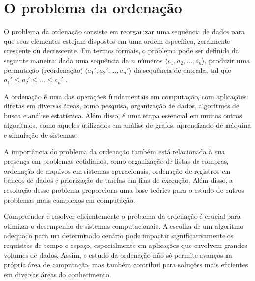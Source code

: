 \section{O problema da ordenação}
O problema da ordenação consiste em reorganizar uma sequência de dados para que seus elementos estejam dispostos em uma ordem específica, geralmente crescente ou decrescente. Em termos formais, o problema pode ser definido da seguinte maneira: dada uma sequência de  $n$  números  $\langle a_1, a_2, ..., a_n \rangle$, produzir uma permutação (reordenação) $\langle a_1', a_2', ..., a_n' \rangle$ da sequência de entrada, tal que $a_1' \le a_2' \le ... \le a_n'$  \cite[p. 46]{cormen2012algoritmos}.

A ordenação é uma das operações fundamentais em computação, com aplicações diretas em diversas áreas, como pesquisa, organização de dados, algoritmos de busca e análise estatística. Além disso, é uma etapa essencial em muitos outros algoritmos, como aqueles utilizados em análise de grafos, aprendizado de máquina e simulação de sistemas.

A importância do problema da ordenação também está relacionada à sua presença em problemas cotidianos, como organização de listas de compras, ordenação de arquivos em sistemas operacionais, ordenação de registros em bancos de dados e priorização de tarefas em filas de execução. Além disso, a resolução desse problema proporciona uma base teórica para o estudo de outros problemas mais complexos em computação.

Compreender e resolver eficientemente o problema da ordenação é crucial para otimizar o desempenho de sistemas computacionais. A escolha de um algoritmo adequado para um determinado cenário pode impactar significativamente os requisitos de tempo e espaço, especialmente em aplicações que envolvem grandes volumes de dados. Assim, o estudo da ordenação não só permite avanços na própria área de computação, mas também contribui para soluções mais eficientes em diversas áreas do conhecimento.